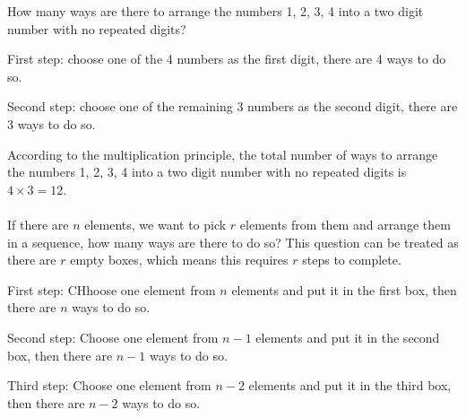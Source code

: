 \documentclass{report}
\begin{document}
\begin{multicols}{2}
  How many ways are there to arrange the numbers 1, 2, 3, 4 into a two digit
  number with no repeated digits? \sol{}

  First step: choose one of the 4 numbers as the first digit, there are 4 ways to
  do so.

  Second step: choose one of the remaining 3 numbers as the second digit, there
  are 3 ways to do so.

  According to the multiplication principle, the total number of ways to arrange
  the numbers 1, 2, 3, 4 into a two digit number with no repeated digits is $4
    \times 3 = 12$. \\\\ If there are $n$ elements, we want to pick $r$ elements
  from them and arrange them in a sequence, how many ways are there to do so?
  This question can be treated as there are $r$ empty boxes, which means this
  requires $r$ steps to complete.

  \begin{center}
  \end{center}

  First step: CHhoose one element from $n$ elements and put it in the first box,
  then there are $n$ ways to do so.

  Second step: Choose one element from $n-1$ elements and put it in the second
  box, then there are $n-1$ ways to do so.

  Third step: Choose one element from $n-2$ elements and put it in the third box,
  then there are $n-2$ ways to do so.


\end{multicols}
\end{document}
